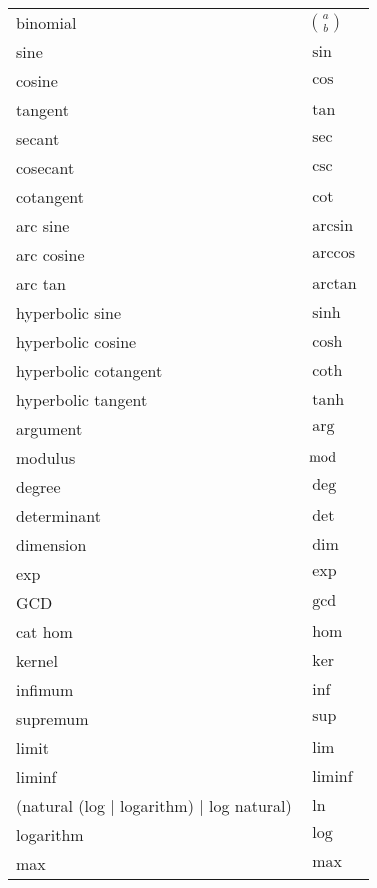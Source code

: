 \documentclass[12pt, a4paper]{article}
\begin{document}
\begin{longtable}{ll}
binomial & $\binom{a}{b}$ \\
sine & $\sin$ \\
cosine & $\cos$ \\
tangent & $\tan$ \\
secant & $\sec$ \\
cosecant & $\csc$ \\
cotangent & $\cot$ \\
arc sine & $\arcsin$ \\
arc cosine & $\arccos$ \\
arc tan & $\arctan$ \\
hyperbolic sine & $\sinh$ \\
hyperbolic cosine & $\cosh$ \\
hyperbolic cotangent & $\coth$ \\
hyperbolic tangent & $\tanh$ \\
argument & $\arg$ \\
modulus & $\bmod$ \\
degree & $\deg$ \\
determinant & $\det$ \\
dimension & $\dim$ \\
exp & $\exp$ \\
GCD & $\gcd$ \\
cat hom & $\hom$ \\
kernel & $\ker$ \\
infimum & $\inf$ \\
supremum & $\sup$ \\
limit & $\lim$ \\
liminf & $\liminf$ \\
(natural (log | logarithm) | log natural) & $\ln$ \\
logarithm & $\log$ \\
max & $\max$ \\

\end{longtable}
\end{document}

